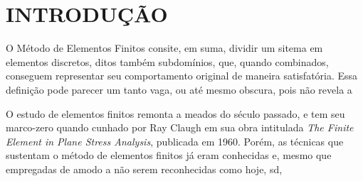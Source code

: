

\chapter{INTRODUÇÃO}

O Método de Elementos Finitos consite, em suma, dividir um sitema em elementos discretos, ditos também subdomínios, que, quando combinados, conseguem representar seu comportamento original de maneira satisfatória. \cite{Bittencourt} Essa definição pode parecer um tanto vaga, ou até mesmo obscura, pois não revela a

\cite{Bittencourt}

O estudo de elementos finitos remonta a meados do século passado, e tem seu marco-zero quando cunhado por Ray Claugh em sua obra intitulada \textit{The Finite Element in Plane Stress Analysis}, publicada em 1960. Porém, as técnicas que sustentam o método de elementos finitos já eram conhecidas e, mesmo que empregadas de amodo a não serem reconhecidas como hoje, sd,  \cite{Azevedo}